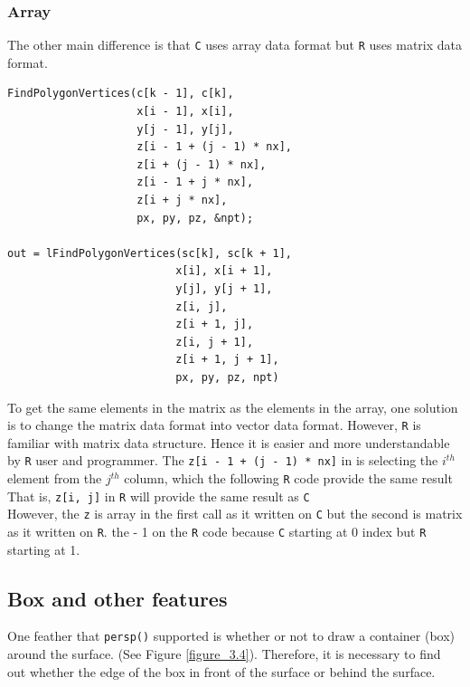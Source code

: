 \documentclass{report}
\begin{document}
\subsubsection{Array}
The other main difference is that \texttt{C} uses array data format but \texttt{R} uses matrix data format. 
\begin{lstlisting}
FindPolygonVertices(c[k - 1], c[k],
                    x[i - 1], x[i],
                    y[j - 1], y[j],
                    z[i - 1 + (j - 1) * nx],
                    z[i + (j - 1) * nx],
                    z[i - 1 + j * nx],
                    z[i + j * nx],
                    px, py, pz, &npt);

out = lFindPolygonVertices(sc[k], sc[k + 1],
                          x[i], x[i + 1],
                          y[j], y[j + 1],
                          z[i, j],
                          z[i + 1, j],
                          z[i, j + 1],
                          z[i + 1, j + 1],
                          px, py, pz, npt)
\end{lstlisting}



To get the same elements in the matrix as the elements in the array, one solution is to change the matrix data format into vector data format. However, \texttt{R} is familiar with matrix data structure. Hence it is easier and more understandable by \texttt{R} user and programmer. The \texttt{z[i - 1 + (j - 1) * nx]} in  is selecting the $i^{th}$ element from the $j^{th}$ column, which the following \texttt{R} code provide the same result That is, \texttt{z[i, j]} in \texttt{R} will provide the same result as \texttt{C} \\

However, the \texttt{z} is array in the first call as it written on \texttt{C} but the second is matrix as it written on \texttt{R}. the - 1 on the \texttt{R} code because \texttt{C} starting at 0 index but \texttt{R} starting at 1.\\

\subsection{Box and other features}
One feather that \texttt{persp()} supported is whether or not to draw a container (box) around the surface. (See Figure \ref{figure_3.4}). Therefore, it is necessary to find out whether the edge of the box in front of the surface or behind the surface. \\ 
\end{document}
